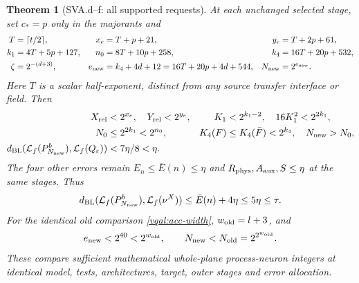 \documentclass[11pt]{article}
\theoremstyle{plain}
\newtheorem{theorem}{Theorem}[section]
\theoremstyle{definition}
\theoremstyle{remark}
\begin{document}
\begin{theorem}[SVA.d--f: all supported requests]\label{sva:width}
At each unchanged selected stage, set $c_*=p$ only in the majorants and
\begin{align}\label{sva:exponents}
 T&=\lceil t/2\rceil,&x_e&=T+p+21,&y_e&=T+2p+61,\nonumber\\
 k_1&=4T+5p+127,&n_0&=8T+10p+258,&k_4&=16T+20p+532,\nonumber\\
 \zeta&=2^{-(d+3)},&e_{\rm new}&=k_4+4d+12
              =16T+20p+4d+544,&N_{\rm new}&=2^{e_{\rm new}}.
\end{align}
Here $T$ is a scalar half-exponent, distinct from any source transfer
interface or field. Then
\begin{align}\label{sva:enclosure-result}
 X_{\rm rel}&<2^{x_e},\quad Y_{\rm rel}<2^{y_e},
 &K_1&<2^{k_1-2},\quad16K_1^2<2^{2k_1},\nonumber\\
 N_0&\le2^{2k_1}<2^{n_0},
 &K_4(F)&\le K_4(\bar F)<2^{k_4},\quad N_{\rm new}>N_0,\nonumber\\
 d_{\rm BL}(\mathcal L_f(P_{N_{\rm new}}^b),
                \mathcal L_f(Q_\varepsilon))&<7\eta/8<\eta.
\end{align}
The four other errors remain $E_n\le\bar E(n)\le\eta$ and
$R_{\rm phys},A_{\rm aux},S\le\eta$ at the same stages. Thus
\begin{equation}\label{sva:target}
 d_{\rm BL}(\mathcal L_f(P_{N_{\rm new}}^b),\mathcal L_f(\nu^X))
 \le\bar E(n)+4\eta\le5\eta\le\tau.
\end{equation}
For the identical old comparison \eqref{vqal:acc-width},
$w_{\rm old}=l+3$, and
\begin{equation}\label{sva:order}
 e_{\rm new}<2^{40}<2^{w_{\rm old}},\qquad
 N_{\rm new}<N_{\rm old}=2^{2^{w_{\rm old}}}.
\end{equation}
These compare sufficient mathematical whole-plane process-neuron
integers at identical model, tests, architectures, target, outer stages
and error allocation.
\end{theorem}
\end{document}
